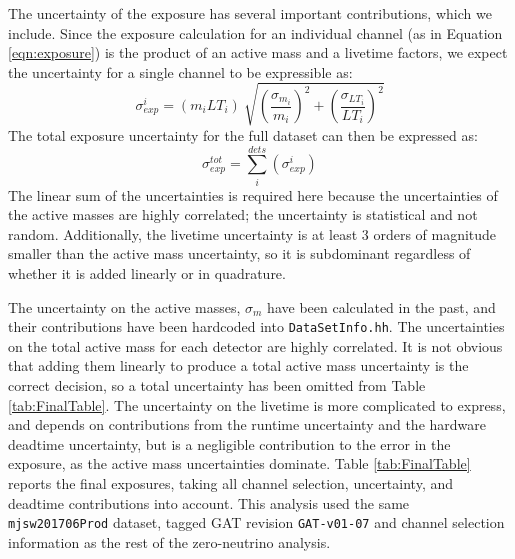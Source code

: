 \documentclass[notitlepage,rmp,aps,10pt]{revtex4-1}
\newcommand{\tty}{\texttt}
\begin{document}
The uncertainty of the exposure has several important contributions, which we include.
Since the exposure calculation for an individual channel (as in Equation \ref{eqn:exposure}) is the product of an active mass and a livetime factors, we expect the uncertainty for a single channel to be expressible as:
\begin{equation}
    \sigma_{exp}^{i} = (m_i LT_i)\ \sqrt{\left(\frac{\sigma_{m_i}}{m_i}\right)^2 + \left(\frac{\sigma_{LT_i}}{LT_i}\right)^2}
\end{equation}
The total exposure uncertainty for the full dataset can then be expressed as:
\begin{equation}
    \sigma_{exp}^{tot} = \sum_i^{dets}(\sigma_{exp}^{i})
\end{equation}
The linear sum of the uncertainties is required here because the uncertainties of the active masses are highly correlated; the uncertainty is statistical and not random.
Additionally, the livetime uncertainty is at least 3 orders of magnitude smaller than the active mass uncertainty, so it is subdominant regardless of whether it is added linearly or in quadrature.

The uncertainty on the active masses, $\sigma_{m}$ have been calculated in the past, and their contributions have been hardcoded into \texttt{DataSetInfo.hh}. The uncertainties on the total active mass for each detector are highly correlated.  It is not obvious that adding them linearly to produce a total active mass uncertainty is the correct decision, so a total uncertainty has been omitted from Table \ref{tab:FinalTable}.
The uncertainty on the livetime is more complicated to express, and depends on contributions from the runtime uncertainty and the hardware deadtime uncertainty, but is a negligible contribution to the error in the exposure, as the active mass uncertainties dominate.
Table \ref{tab:FinalTable} reports the final exposures, taking all channel selection, uncertainty, and deadtime contributions into account.  This analysis used the same \tty{mjsw201706Prod} dataset, tagged GAT revision \tty{GAT-v01-07} and channel selection information as the rest of the zero-neutrino analysis.
\end{document}
